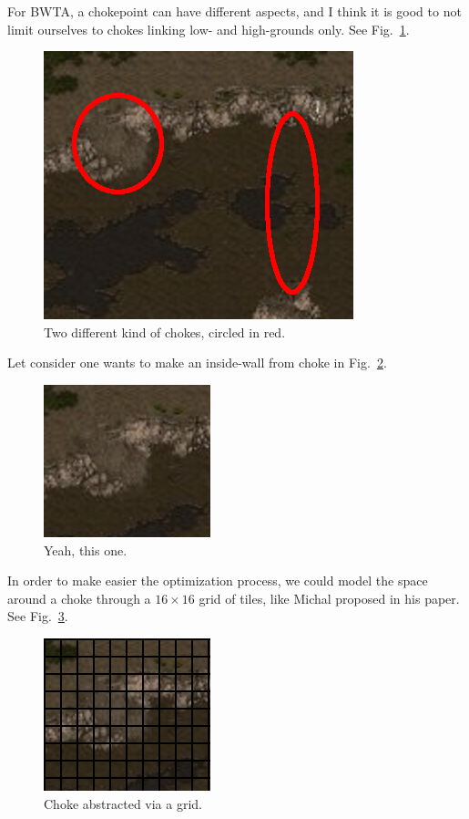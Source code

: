 \documentclass[11pt]{article}
\begin{document}
For BWTA, a  chokepoint can have different aspects, and  I think it is
good to  not limit ourselves  to chokes linking low-  and high-grounds
only. See Fig.~\ref{figs:chokes}.

\begin{figure}[!h]
  \centering
  \includegraphics[width=.6\linewidth]{figs/chokes_circled}
  \caption{Two different kind of chokes, circled in red.}
  \label{figs:chokes}
\end{figure}

Let  consider  one  wants  to   make  an  inside-wall  from  choke  in
Fig.~\ref{figs:choke_alone}.

\begin{figure}[!h]
  \centering
  \includegraphics[width=.4\linewidth]{figs/choke_alone}
  \caption{Yeah, this one.}
  \label{figs:choke_alone}
\end{figure}

In order to  make easier the optimization process,  we could model the
space around  a choke  through a  $16 \times 16$  grid of  tiles, like
Michal proposed in his paper. See Fig.~\ref{figs:choke_grid}.

\begin{figure}[!h]
  \centering
  \includegraphics[width=.4\linewidth]{figs/choke_grid}
  \caption{Choke abstracted via a grid.}
  \label{figs:choke_grid}
\end{figure}
\end{document}
